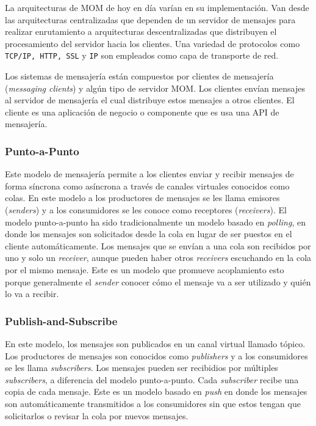 \documentclass[article]{IEEEtran}
\begin{document}
La arquitecturas de MOM de hoy en día varían en su implementación. Van desde las arquitecturas centralizadas que dependen de un servidor de mensajes para realizar enrutamiento a arquitecturas descentralizadas que distribuyen el procesamiento del servidor hacia los clientes. Una variedad de protocolos como \texttt{TCP/IP, HTTP, SSL} y \texttt{IP} son empleados como capa de transporte de red.

Los sistemas de mensajería están compuestos por clientes de mensajería (\emph{messaging clients}) y algún tipo de servidor MOM. Los clientes envían mensajes al servidor de mensajería el cual distribuye estos mensajes a otros clientes. El cliente es una aplicación de negocio o componente que es usa una API de mensajería.

\subsubsection{Punto-a-Punto}
Este modelo de mensajería permite a los clientes enviar y recibir mensajes de forma síncrona como asíncrona a través de canales virtuales conocidos como colas. En este modelo a los productores de mensajes se les llama emisores (\emph{senders}) y a los consumidores se les conoce como receptores (\emph{receivers}). El modelo punto-a-punto ha sido tradicionalmente un modelo basado en \emph{polling}, en donde los mensajes son solicitados desde la cola en lugar de ser puestos en el cliente automáticamente. Los mensajes que se envían a una cola son recibidos por uno y solo un \emph{receiver}, aunque pueden haber otros \emph{receivers} escuchando en la cola por el mismo mensaje. Este es un modelo que promueve acoplamiento esto porque generalmente el \emph{sender} conocer cómo el mensaje va a ser utilizado y quién lo va a recibir. 

\subsubsection{Publish-and-Subscribe}
En este modelo, los mensajes son publicados en un canal virtual llamado tópico. Los productores de mensajes son conocidos como \emph{publishers} y a los consumidores se les llama \emph{subscribers}. Los mensajes pueden ser recibidios por múltiples \emph{subscribers}, a diferencia del modelo punto-a-punto. Cada \emph{subscriber} recibe una copia de cada mensaje. Este es un modelo basado en \emph{push} en donde los mensajes son automáticamente transmitidos a los consumidores sin que estos tengan que solicitarlos o revisar la cola por nuevos mensajes. 
\end{document}
